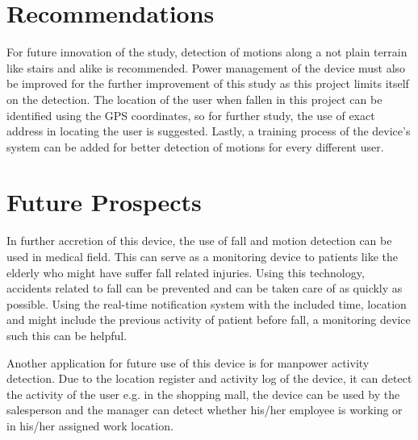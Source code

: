 \section{Recommendations}

For future innovation of the study, detection of motions along a not plain terrain like stairs and alike is recommended. Power management of the device must also be improved for the further improvement of this study as this project limits itself on the detection. The location of the user when fallen in this project can be identified using the GPS coordinates, so for further study, the use of exact address in locating the user is suggested. Lastly, a training process of the device’s system can be added for better detection of motions for every different user.

\section{Future Prospects}

In further accretion of this device, the use of fall and motion detection can be used in medical field. This can serve as a monitoring device to patients like the elderly who might have suffer fall related injuries. Using this technology, accidents related to fall can be prevented and can be taken care of as quickly as possible. Using the real-time notification system with the included time, location and might include the previous activity of patient before fall, a monitoring device such this can be helpful. 

Another application for future use of this device is for manpower activity detection. Due to the location register and activity log of the device, it can detect the activity of the user e.g. in the shopping mall, the device can be used by the salesperson and the manager can detect whether his/her employee is working or in his/her assigned work location.

